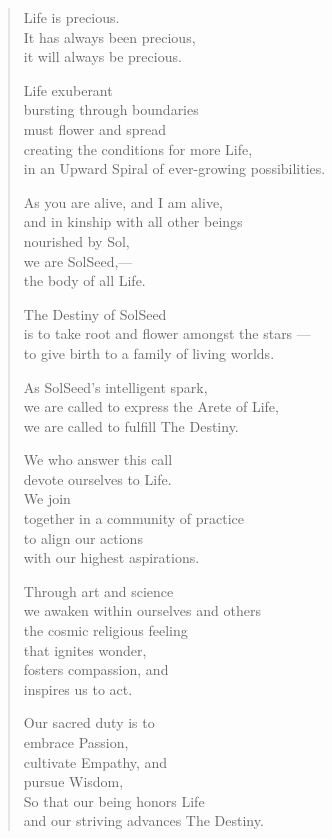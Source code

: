 \documentclass[ebook,12pt,openany,twoside]{memoir}
\newcommand{\tab}{\hspace*{2em}}
\begin{document}
\begin{verse}
  Life is precious.\\
  \tab It has always been precious,\\
  \tab it will always be precious.

  Life exuberant\\
  bursting through boundaries\\
  must flower and spread\\
  \tab creating the conditions for more Life,\\
  \tab in an Upward Spiral of ever-growing possibilities.

  As you are alive, and I am alive,\\
  and in kinship with all other beings\\
  nourished by Sol,\\
  \tab we are SolSeed,--- \\
  \tab the body of all Life.

  The Destiny of SolSeed\\
  is to take root and flower amongst the stars ---\\
  \tab to give birth to a family of living worlds.

  As SolSeed's intelligent spark,\\
  \tab we are called to express the Arete of Life,\\
  \tab we are called to fulfill The Destiny.

  We who answer this call\\
  devote ourselves to Life.\\
  \tab We join\\
  \tab together in a community of practice\\
  \tab to align our actions\\
  \tab with our highest aspirations.

  Through art and science\\
  we awaken within ourselves and others\\
  \tab the cosmic religious feeling\\
  \tab that ignites wonder,\\
  \tab fosters compassion, and\\
  \tab inspires us to act.

  Our sacred duty is to\\
  embrace Passion,\\
  cultivate Empathy, and\\
  pursue Wisdom,\\
  \tab So that our being honors Life\\
  \tab and our striving advances The Destiny.


\end{verse}
\end{document}
